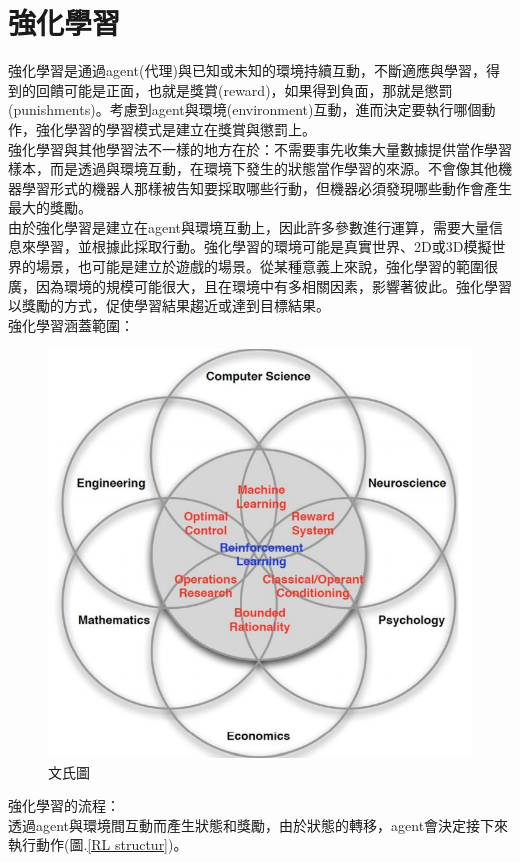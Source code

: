 \documentclass[14pt,a4paper]{report}  %
\begin{document}
\section{強化學習}
強化學習是通過agent(代理)與已知或未知的環境持續互動，不斷適應與學習，得到的回饋可能是正面，也就是獎賞(reward)，如果得到負面，那就是懲罰(punishments)。考慮到agent與環境(environment)互動，進而決定要執行哪個動作，強化學習的學習模式是建立在獎賞與懲罰上。\\
強化學習與其他學習法不一樣的地方在於：不需要事先收集大量數據提供當作學習樣本，而是透過與環境互動，在環境下發生的狀態當作學習的來源。不會像其他機器學習形式的機器人那樣被告知要採取哪些行動，但機器必須發現哪些動作會產生最大的獎勵。\\
由於強化學習是建立在agent與環境互動上，因此許多參數進行運算，需要大量信息來學習，並根據此採取行動。強化學習的環境可能是真實世界、2D或3D模擬世界的場景，也可能是建立於遊戲的場景。從某種意義上來說，強化學習的範圍很廣，因為環境的規模可能很大，且在環境中有多相關因素，影響著彼此。強化學習以獎勵的方式，促使學習結果趨近或達到目標結果。\\
強化學習涵蓋範圍：\\

\begin{figure}[hbt!]
\begin{center}
\includegraphics[scale=0.6]{Faces_of_Reinforcement_Learning}
\caption{\Large 文氏圖}
\label{文氏圖}
\end{center}
\end{figure}
強化學習的流程：\\
透過agent與環境間互動而產生狀態和獎勵，由於狀態的轉移，agent會決定接下來執行動作(圖.\ref{RL structur})。\\[12pt]
\end{document}

